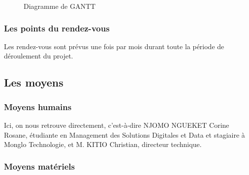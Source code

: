 \begin{figure}
 
  \caption{Diagramme de GANTT}
  \label{Diagramme de GANTT}
 \end{figure}

\subsubsection{Les points du rendez-vous}
Les rendez-vous sont prévus une fois par mois durant toute la période de déroulement du projet.


\subsection{Les moyens }
\subsubsection{Moyens humains }
	Ici, on nous retrouve directement, c’est-à-dire NJOMO NGUEKET Corine Rosane, étudiante en Management des Solutions Digitales et Data et stagiaire à Monglo Technologie, et M. KITIO Christian, directeur technique.  
\subsubsection{Moyens matériels }

